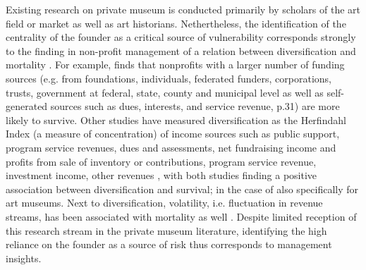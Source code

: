 \documentclass[12pt]{article}
\begin{document}
Existing research on private museum is conducted primarily by scholars of the art field or market as well as art historians.
Nethertheless, the identification of the centrality of the founder as a critical source of vulnerability corresponds strongly to the finding in non-profit management of a relation between diversification and mortality \parencite{Tuckman_Chang_1991_vulnerability}.
For example, \cite{Bielefeld_1994_survival} finds that nonprofits with a larger number of funding sources (e.g. from foundations, individuals, federated funders, corporations, trusts, government at federal, state, county and municipal level as well as self-generated sources such as dues, interests, and service revenue, p.31) are more likely to survive.
Other studies have measured diversification as the Herfindahl Index (a measure of concentration) of income sources such as public support, program service revenues, dues and assessments, net fundraising income and profits from sale of inventory \parencite[p.381]{Hager_2001_vulnerability} or contributions, program service revenue, investment income, other revenues \parencite[p.37]{Lu_Shon_Zhang_2019_dissolution}, with both studies finding a positive association between diversification and survival; in the case of \cite{Hager_2001_vulnerability} also specifically for art museums.
Next to diversification, volatility, i.e. fluctuation in revenue streams, has been associated with mortality as well \parencite{Mayer_2022_simmer}.
Despite limited reception of this research stream in the private museum literature, identifying the high reliance on the founder as a source of risk thus corresponds to management insights. 
\end{document}
